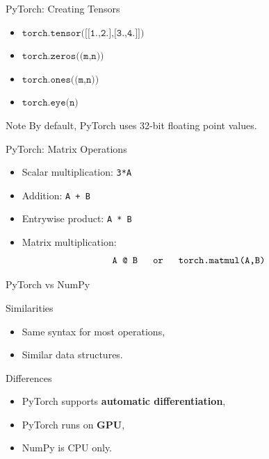 \documentclass[aspectratio=169]{beamer}
\begin{document}
\begin{frame}{PyTorch: Creating Tensors}

\begin{itemize}
    \item $\texttt{torch.tensor([[1.,2.],[3.,4.]])}$
    \item $\texttt{torch.zeros((m,n))}$
    \item $\texttt{torch.ones((m,n))}$
    \item $\texttt{torch.eye(n)}$
\end{itemize}

\pause

\begin{alertblock}{Note}
By default, PyTorch uses 32-bit floating point values.
\end{alertblock}

\end{frame}

\begin{frame}{PyTorch: Matrix Operations}

\begin{itemize}
    \item Scalar multiplication: \texttt{3*A}
    \item Addition: \texttt{A + B}
    \item Entrywise product: \texttt{A * B}
    \item Matrix multiplication:
$$
\texttt{A @ B \quad or \quad torch.matmul(A,B)}
$$
\end{itemize}

\end{frame}

\begin{frame}{PyTorch vs NumPy}

\begin{block}{Similarities}
\begin{itemize}
    \item Same syntax for most operations,
    \item Similar data structures.
\end{itemize}
\end{block}

\pause

\begin{alertblock}{Differences}
\begin{itemize}
    \item PyTorch supports \textbf{automatic differentiation},
    \item PyTorch runs on \textbf{GPU},
    \item NumPy is CPU only.
\end{itemize}
\end{alertblock}

\end{frame}
\end{document}

